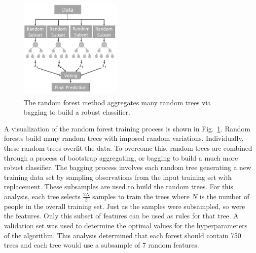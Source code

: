 \documentclass[10pt,twocolumn,conference]{IEEEtran}
\begin{document}


\begin{figure}[t]
	\centering
	\includegraphics[width=5cm,height=5cm,keepaspectratio,trim={0mm 2.5mm 0mm 2mm},clip]{RandForest_BW}
	\caption{The random forest method aggregates many random trees via bagging to build a robust classifier.}
	\vspace{-8pt}
	\label{fig:rand_forest}
\end{figure}  


A visualization of the random forest training process is shown in Fig.~\ref{fig:rand_forest}.
Random forests build many random trees with imposed random variations.
Individually, these random trees overfit the data.
To overcome this, random trees are combined through a process of bootstrap aggregating, or bagging to build a much more robust classifier.
The bagging process involves each random tree generating a new training data set by sampling observations from the input training set with replacement.
These subsamples are used to build the random trees.
For this analysis, each tree selects $\frac{2N}{3}$ samples to train the trees where $N$ is the number of people in the overall training set.
Just as the samples were subsampled, so were the features.
Only this subset of features can be used as rules for that tree.
A validation set was used to determine the optimal values for the hyperparameters of the algorithm.
This analysis determined that each forest should contain 750 trees and each tree would use a subsample of 7 random features.
\end{document}
